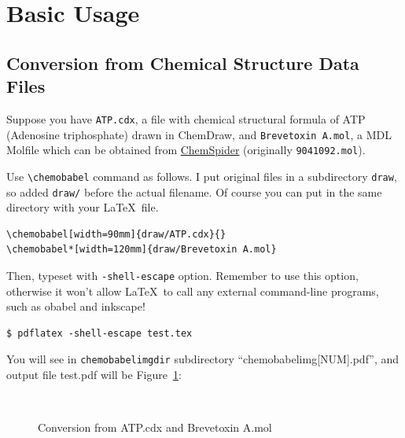 \documentclass[12pt]{ltjsarticle}
\def\Lcode#1{\texttt{#1}}
\begin{document}
\clearpage

\section{Basic Usage}
\label{basic}

\subsection{Conversion from Chemical Structure Data Files}

Suppose you have \verb|ATP.cdx|, a file with chemical structural formula
of ATP (Adenosine triphosphate) drawn in ChemDraw, and
\verb|Brevetoxin A.mol|, a MDL Molfile which can be obtained from
\href{http://www.chemspider.com/}{ChemSpider} (originally \verb|9041092.mol|).

Use \verb|\chemobabel| command as follows. I put original files in a
subdirectory \Lcode{draw}, so added \Lcode{draw/} before the actual filename.
Of course you can put in the same directory with your \LaTeX\ file.

\begin{verbatim}
\chemobabel[width=90mm]{draw/ATP.cdx}{}
\chemobabel*[width=120mm]{draw/Brevetoxin A.mol}
\end{verbatim}

Then, typeset with \verb|-shell-escape| option.
Remember to use this option, otherwise it won't allow \LaTeX\ to
call any external command-line programs, such as obabel and inkscape!
\begin{verbatim}
$ pdflatex -shell-escape test.tex
\end{verbatim}
You will see in \verb|chemobabelimgdir| subdirectory ``chemobabelimg[NUM].pdf'',
and output file test.pdf will be Figure~\ref{fig:chem1}:

\begin{figure}[h]
  \centering
   \\ \vspace{1cm}
  \caption{Conversion from ATP.cdx and Brevetoxin A.mol}\label{fig:chem1}
\end{figure}
\end{document}
